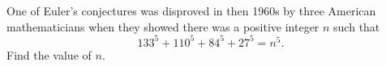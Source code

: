 One of Euler's conjectures was disproved in then 1960s by three American mathematicians when they showed there was a positive integer $ n$ such that \[133^5 + 110^5 + 84^5 + 27^5 = n^5.\]Find the value of $ n$.